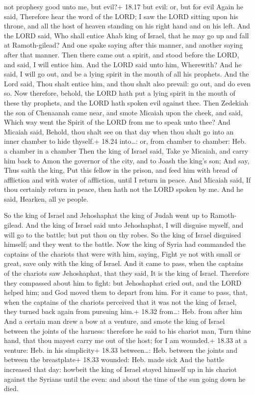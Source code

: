 not prophesy good unto me, but evil?+ 18.17 but evil: or, but for evil
 Again he said, Therefore hear the word of the LORD; I saw
the LORD sitting upon his throne, and all the host of heaven standing on
his right hand and on his left.  And the LORD said, Who
shall entice Ahab king of Israel, that he may go up and fall at
Ramoth-gilead? And one spake saying after this manner, and another
saying after that manner.  Then there came out a spirit,
and stood before the LORD, and said, I will entice him. And the LORD
said unto him, Wherewith?  And he said, I will go out, and
be a lying spirit in the mouth of all his prophets. And the Lord said,
Thou shalt entice him, and thou shalt also prevail: go out, and do even
so.  Now therefore, behold, the LORD hath put a lying
spirit in the mouth of these thy prophets, and the LORD hath spoken evil
against thee.  Then Zedekiah the son of Chenaanah came
near, and smote Micaiah upon the cheek, and said, Which way went the
Spirit of the LORD from me to speak unto thee?  And Micaiah
said, Behold, thou shalt see on that day when thou shalt go into an
inner chamber to hide thyself.+ 18.24 into\ldots: or, from chamber to
chamber: Heb. a chamber in a chamber  Then the king of
Israel said, Take ye Micaiah, and carry him back to Amon the governor of
the city, and to Joash the king's son;  And say, Thus saith
the king, Put this fellow in the prison, and feed him with bread of
affliction and with water of affliction, until I return in peace.
 And Micaiah said, If thou certainly return in peace, then
hath not the LORD spoken by me. And he said, Hearken, all ye people.

 So the king of Israel and Jehoshaphat the king of Judah
went up to Ramoth-gilead.  And the king of Israel said unto
Jehoshaphat, I will disguise myself, and will go to the battle; but put
thou on thy robes. So the king of Israel disguised himself; and they
went to the battle.  Now the king of Syria had commanded
the captains of the chariots that were with him, saying, Fight ye not
with small or great, save only with the king of Israel. 
And it came to pass, when the captains of the chariots saw Jehoshaphat,
that they said, It is the king of Israel. Therefore they compassed about
him to fight: but Jehoshaphat cried out, and the LORD helped him; and
God moved them to depart from him.  For it came to pass,
that, when the captains of the chariots perceived that it was not the
king of Israel, they turned back again from pursuing him.+ 18.32
from\ldots: Heb. from after him  And a certain man drew a
bow at a venture, and smote the king of Israel between the joints of the
harness: therefore he said to his chariot man, Turn thine hand, that
thou mayest carry me out of the host; for I am wounded.+ 18.33 at a
venture: Heb. in his simplicity+ 18.33 between\ldots: Heb. between the
joints and between the breastplate+ 18.33 wounded: Heb. made sick
 And the battle increased that day: howbeit the king of
Israel stayed himself up in his chariot against the Syrians until the
even: and about the time of the sun going down he died.

